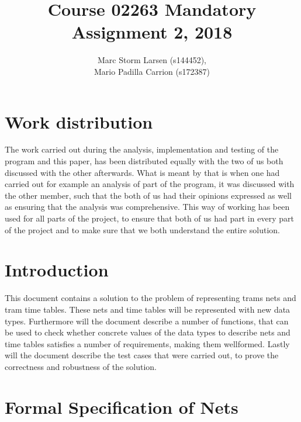 \documentclass[a4]{article}
\title{Course 02263 Mandatory Assignment 2, 2018}
\author{Marc Storm Larsen (s144452),\\ 
        Mario Padilla Carrion (s172387)}
\begin{document}
\maketitle

\tableofcontents
\newpage

\section{Work distribution}
The work carried out during the analysis, implementation and testing of the program and this paper, has been distributed equally with the two of us both discussed with the other afterwards. What is meant by that is when one had carried out for example an analysis of part of the program, it was discussed with the other member, such that the both of us had their opinions expressed as well as ensuring that the analysis was comprehensive. This way of working has been used for all parts of the project, to ensure that both of us had part in every part of the project and to make sure that we both understand the entire solution.

\section{Introduction}
This document contains a solution to the problem of representing trams nets and tram time tables. These nets and time tables will be represented with new data types. Furthermore will the document describe a number of functions, that can be used to check whether concrete values of the data types to describe nets and time tables satisfies a number of requirements, making them wellformed. Lastly will the document describe the test cases that were carried out, to prove the correctness and robustness of the solution.

\section{Formal Specification of Nets}


\end{document}
